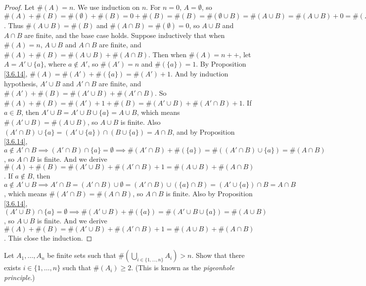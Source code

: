 \begin{proof}
    Let \(\#(A) = n\).
    We use induction on \(n\).
    For \(n = 0\), \(A = \emptyset\), so \(\#(A) + \#(B) = \#(\emptyset) + \#(B) = 0 + \#(B) = \#(B) = \#(\emptyset \cup B) = \#(A \cup B) = \#(A \cup B) + 0 = \#(A \cup B) + \#(\emptyset) = \#(A \cup B) + \#(\emptyset \cap B) = \#(A \cup B) + \#(A \cap B)\).
    Thus \(\#(A \cup B) = \#(B)\) and \(\#(A \cap B) = \#(\emptyset) = 0\), so \(A \cup B\) and \(A \cap B\) are finite, and the base case holds.
    Suppose inductively that when \(\#(A) = n\), \(A \cup B\) and \(A \cap B\) are finite, and \(\#(A) + \#(B) = \#(A \cup B) + \#(A \cap B)\).
    Then when \(\#(A) = n++\), let \(A = A' \cup \{a\}\), where \(a \notin A'\), so \(\#(A') = n\) and \(\#(\{a\}) = 1\).
    By Proposition \ref{3.6.14}, \(\#(A) = \#(A') + \#(\{a\}) = \#(A') + 1\).
    And by induction hypothesis, \(A' \cup B\) and \(A' \cap B\) are finite, and \(\#(A') + \#(B) = \#(A' \cup B) + \#(A' \cap B)\).
    So \(\#(A) + \#(B) = \#(A') + 1 + \#(B) = \#(A' \cup B) + \#(A' \cap B) + 1\).
    If \(a \in B\), then \(A' \cup B = A' \cup B \cup \{a\} = A \cup B\), which means \(\#(A' \cup B) = \#(A \cup B)\), so \(A \cup B\) is finite.
    Also \((A' \cap B) \cup \{a\} = (A' \cup \{a\}) \cap (B \cup \{a\}) = A \cap B\), and by Proposition \ref{3.6.14}, \(a \notin A' \cap B \implies (A' \cap B) \cap \{a\} = \emptyset \implies \#(A' \cap B) + \#(\{a\}) = \#((A' \cap B) \cup \{a\}) = \#(A \cap B)\), so \(A \cap B\) is finite.
    And we derive \(\#(A) + \#(B) = \#(A' \cup B) + \#(A' \cap B) + 1 = \#(A \cup B) + \#(A \cap B)\).
    If \(a \notin B\), then \(a \notin A' \cup B \implies A' \cap B = (A' \cap B) \cup \emptyset = (A' \cap B) \cup (\{a\} \cap B) = (A' \cup \{a\}) \cap B = A \cap B\), which means \(\#(A' \cap B) = \#(A \cap B)\), so \(A \cap B\) is finite.
    Also by Proposition \ref{3.6.14}, \((A' \cup B) \cap \{a\} = \emptyset \implies \#(A' \cup B) + \#(\{a\}) = \#(A' \cup B \cup \{a\}) = \#(A \cup B)\), so \(A \cup B\) is finite.
    And we derive \(\#(A) + \#(B) = \#(A' \cup B) + \#(A' \cap B) + 1 = \#(A \cup B) + \#(A \cap B)\).
    This close the induction.
\end{proof}

\begin{exercise}\label{ex 3.6.10}
    Let \(A_1, \dots, A_n\) be finite sets such that \(\#(\bigcup_{i \in \{1, \dots, n\}} A_i) > n\).
    Show that there exists \(i \in \{1, \dots, n\}\) such that \(\#(A_i) \geq 2\).
    (This is known as the \emph{pigeonhole principle}.)
\end{exercise}

